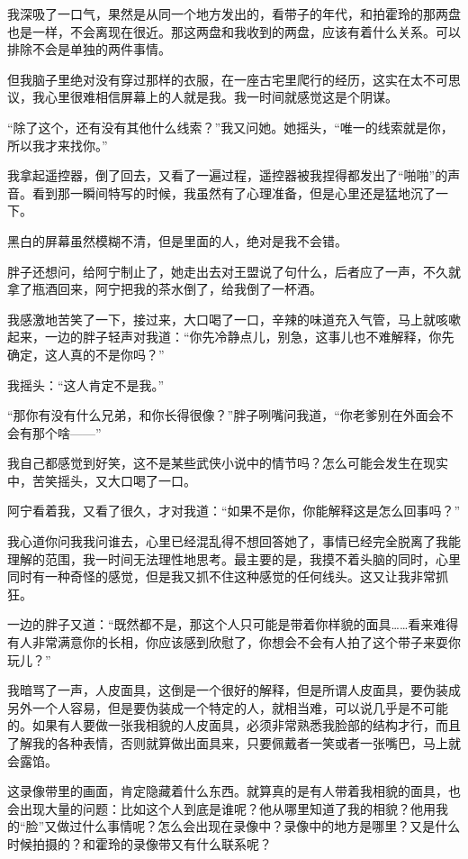 我深吸了一口气，果然是从同一个地方发出的，看带子的年代，和拍霍玲的那两盘也是一样，不会离现在很近。那这两盘和我收到的两盘，应该有着什么关系。可以排除不会是单独的两件事情。

但我脑子里绝对没有穿过那样的衣服，在一座古宅里爬行的经历，这实在太不可思议，我心里很难相信屏幕上的人就是我。我一时间就感觉这是个阴谋。

“除了这个，还有没有其他什么线索？”我又问她。她摇头，“唯一的线索就是你，所以我才来找你。”

我拿起遥控器，倒了回去，又看了一遍过程，遥控器被我捏得都发出了“啪啪”的声音。看到那一瞬间特写的时候，我虽然有了心理准备，但是心里还是猛地沉了一下。

黑白的屏幕虽然模糊不清，但是里面的人，绝对是我不会错。

胖子还想问，给阿宁制止了，她走出去对王盟说了句什么，后者应了一声，不久就拿了瓶酒回来，阿宁把我的茶水倒了，给我倒了一杯酒。

我感激地苦笑了一下，接过来，大口喝了一口，辛辣的味道充入气管，马上就咳嗽起来，一边的胖子轻声对我道：“你先冷静点儿，别急，这事儿也不难解释，你先确定，这人真的不是你吗？”

我摇头：“这人肯定不是我。”

“那你有没有什么兄弟，和你长得很像？”胖子咧嘴问我道，“你老爹别在外面会不会有那个啥——”

我自己都感觉到好笑，这不是某些武侠小说中的情节吗？怎么可能会发生在现实中，苦笑摇头，又大口喝了一口。

阿宁看着我，又看了很久，才对我道：“如果不是你，你能解释这是怎么回事吗？”

我心道你问我我问谁去，心里已经混乱得不想回答她了，事情已经完全脱离了我能理解的范围，我一时间无法理性地思考。最主要的是，我摸不着头脑的同时，心里同时有一种奇怪的感觉，但是我又抓不住这种感觉的任何线头。这又让我非常抓狂。

一边的胖子又道：“既然都不是，那这个人只可能是带着你样貌的面具……看来难得有人非常满意你的长相，你应该感到欣慰了，你想会不会有人拍了这个带子来耍你玩儿？”

我暗骂了一声，人皮面具，这倒是一个很好的解释，但是所谓人皮面具，要伪装成另外一个人容易，但是要伪装成一个特定的人，就相当难，可以说几乎是不可能的。如果有人要做一张我相貌的人皮面具，必须非常熟悉我脸部的结构才行，而且了解我的各种表情，否则就算做出面具来，只要佩戴者一笑或者一张嘴巴，马上就会露馅。

这录像带里的画面，肯定隐藏着什么东西。就算真的是有人带着我相貌的面具，也会出现大量的问题：比如这个人到底是谁呢？他从哪里知道了我的相貌？他用我的“脸”又做过什么事情呢？怎么会出现在录像中？录像中的地方是哪里？又是什么时候拍摄的？和霍玲的录像带又有什么联系呢？

